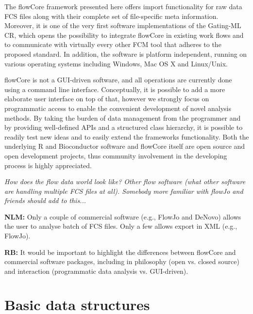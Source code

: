 \documentclass[12pt]{article}
\begin{document}
The flowCore framework presented here offers import functionality for
raw data FCS files along with their complete set of file-specific meta
information.  Moreover, it is one of the very first software
implementations of the Gating-ML CR, which opens the possibility to
integrate flowCore in existing work flows and to communicate with
virtually every other FCM tool that adheres to the proposed
standard. In addition, the software is platform independent, running
on various operating systems including Windows, Mac OS X and
Linux/Unix.

flowCore is not a GUI-driven software, and all operations are
currently done using a command line interface. Conceptually, it is
possible to add a more elaborate user interface on top of that,
however we strongly focus on programmatic access to enable the
convenient development of novel analysis methods. By taking the burden
of data management from the programmer and by providing well-defined
APIs and a structured class hierarchy, it is possible to readily test
new ideas and to easily extend the frameworks functionality. Both the
underlying R and Bioconductor software and flowCore itself are open
source and open development projects, thus community involvement in the
developing process is highly appreciated.

\textit{How does the flow data world look like? Other flow software
  (what other software are handling multiple FCS files at
  all). Somebody more familiar with flowJo and friends should add to
  this...}

{\bf NLM:} Only a couple of commercial software (e.g., FlowJo and
DeNovo) allows the user to analyse batch of FCS files.  Only a few
allows export in XML (e.g., FlowJo).


{\bf RB:}  It would be important to highlight
the differences between flowCore and commercial software packages,
including in philosophy (open vs. closed source) and interaction
(programmatic data analysis vs. GUI-driven). 



\section{Basic data structures}
\end{document}
